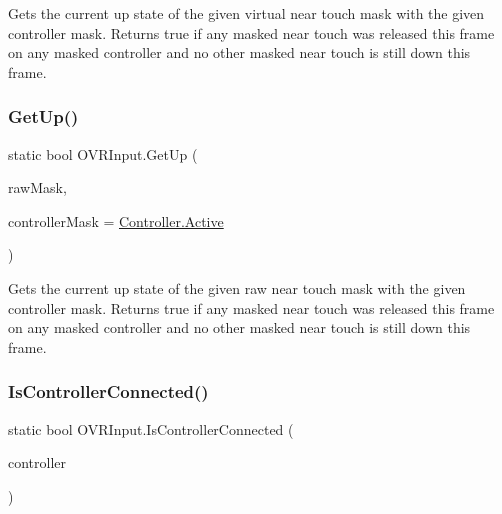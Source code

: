 Gets the current up state of the given virtual near touch mask with the given controller mask. Returns true if any masked near touch was released this frame on any masked controller and no other masked near touch is still down this frame. 

\mbox{\label{class_o_v_r_input_a183c4e73f60720968a86fae467e9fc4f}} 
\subsubsection{\texorpdfstring{Get\+Up()}{GetUp()}\hspace{0.1cm}{\footnotesize\ttfamily [6/6]}}
{\footnotesize\ttfamily static bool O\+V\+R\+Input.\+Get\+Up (\begin{DoxyParamCaption}\item[{\mbox{\hyperlink{class_o_v_r_input_ac9c3c10aa9911507c6dc66e2dd6ec60e}{Raw\+Near\+Touch}}}]{raw\+Mask,  }\item[{\mbox{\hyperlink{class_o_v_r_input_a5c86f9052a9cbb0b73779ff5704d60a8}{Controller}}}]{controller\+Mask = {\ttfamily \mbox{\hyperlink{class_o_v_r_input_a5c86f9052a9cbb0b73779ff5704d60a8a4d3d769b812b6faa6b76e1a8abaece2d}{Controller.\+Active}}} }\end{DoxyParamCaption})\hspace{0.3cm}{\ttfamily [static]}}



Gets the current up state of the given raw near touch mask with the given controller mask. Returns true if any masked near touch was released this frame on any masked controller and no other masked near touch is still down this frame. 

\mbox{\label{class_o_v_r_input_a3f4e283bf5665cbd9e2272d6ed5b54c0}} 
\subsubsection{\texorpdfstring{Is\+Controller\+Connected()}{IsControllerConnected()}}
{\footnotesize\ttfamily static bool O\+V\+R\+Input.\+Is\+Controller\+Connected (\begin{DoxyParamCaption}\item[{\mbox{\hyperlink{class_o_v_r_input_a5c86f9052a9cbb0b73779ff5704d60a8}{Controller}}}]{controller }\end{DoxyParamCaption})\hspace{0.3cm}{\ttfamily [static]}}



